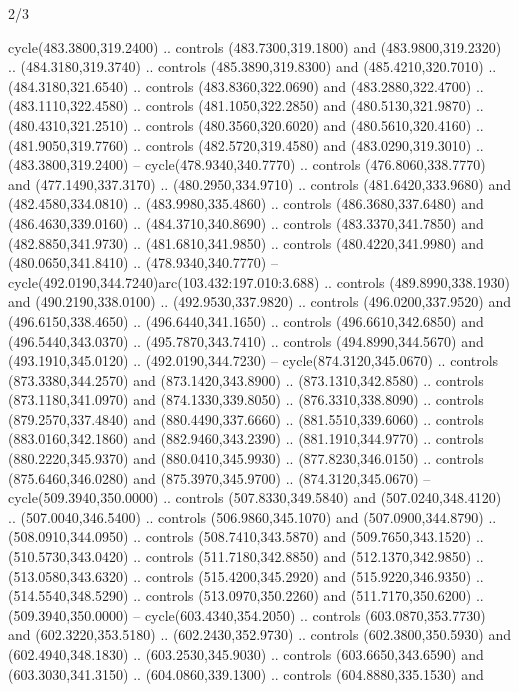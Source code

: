 \begin{flagdescription}{2/3}
\begin{scope}[xshift=\flaglength/2,yshift=\flagwidth/2,scale=\flagwidth/341]
\begin{scope}[xshift=-20mm,yshift=38.3mm,scale=0.1565]
\begin{scope}[y=0.80pt, x=0.80pt, yscale=-1, xscale=1,draw=gold,fill=white]
\begin{scope}[line join=round,line cap=round,line width=1.016\lw]
\begin{scope}[fill]
  cycle(483.3800,319.2400) .. controls (483.7300,319.1800) and
  (483.9800,319.2320) .. (484.3180,319.3740) .. controls (485.3890,319.8300) and
  (485.4210,320.7010) .. (484.3180,321.6540) .. controls (483.8360,322.0690) and
  (483.2880,322.4700) .. (483.1110,322.4580) .. controls (481.1050,322.2850) and
  (480.5130,321.9870) .. (480.4310,321.2510) .. controls (480.3560,320.6020) and
  (480.5610,320.4160) .. (481.9050,319.7760) .. controls (482.5720,319.4580) and
  (483.0290,319.3010) .. (483.3800,319.2400) -- cycle(478.9340,340.7770) ..
  controls (476.8060,338.7770) and (477.1490,337.3170) .. (480.2950,334.9710) ..
  controls (481.6420,333.9680) and (482.4580,334.0810) .. (483.9980,335.4860) ..
  controls (486.3680,337.6480) and (486.4630,339.0160) .. (484.3710,340.8690) ..
  controls (483.3370,341.7850) and (482.8850,341.9730) .. (481.6810,341.9850) ..
  controls (480.4220,341.9980) and (480.0650,341.8410) .. (478.9340,340.7770) --
  cycle(492.0190,344.7240)arc(103.432:197.010:3.688) .. controls
  (489.8990,338.1930) and (490.2190,338.0100) .. (492.9530,337.9820) .. controls
  (496.0200,337.9520) and (496.6150,338.4650) .. (496.6440,341.1650) .. controls
  (496.6610,342.6850) and (496.5440,343.0370) .. (495.7870,343.7410) .. controls
  (494.8990,344.5670) and (493.1910,345.0120) .. (492.0190,344.7230) --
  cycle(874.3120,345.0670) .. controls (873.3380,344.2570) and
  (873.1420,343.8900) .. (873.1310,342.8580) .. controls (873.1180,341.0970) and
  (874.1330,339.8050) .. (876.3310,338.8090) .. controls (879.2570,337.4840) and
  (880.4490,337.6660) .. (881.5510,339.6060) .. controls (883.0160,342.1860) and
  (882.9460,343.2390) .. (881.1910,344.9770) .. controls (880.2220,345.9370) and
  (880.0410,345.9930) .. (877.8230,346.0150) .. controls (875.6460,346.0280) and
  (875.3970,345.9700) .. (874.3120,345.0670) -- cycle(509.3940,350.0000) ..
  controls (507.8330,349.5840) and (507.0240,348.4120) .. (507.0040,346.5400) ..
  controls (506.9860,345.1070) and (507.0900,344.8790) .. (508.0910,344.0950) ..
  controls (508.7410,343.5870) and (509.7650,343.1520) .. (510.5730,343.0420) ..
  controls (511.7180,342.8850) and (512.1370,342.9850) .. (513.0580,343.6320) ..
  controls (515.4200,345.2920) and (515.9220,346.9350) .. (514.5540,348.5290) ..
  controls (513.0970,350.2260) and (511.7170,350.6200) .. (509.3940,350.0000) --
  cycle(603.4340,354.2050) .. controls (603.0870,353.7730) and
  (602.3220,353.5180) .. (602.2430,352.9730) .. controls (602.3800,350.5930) and
  (602.4940,348.1830) .. (603.2530,345.9030) .. controls (603.6650,343.6590) and
  (603.3030,341.3150) .. (604.0860,339.1300) .. controls (604.8880,335.1530) and

\end{scope}
\end{scope}
\end{scope}
\end{scope}
\end{scope}
\end{flagdescription}
